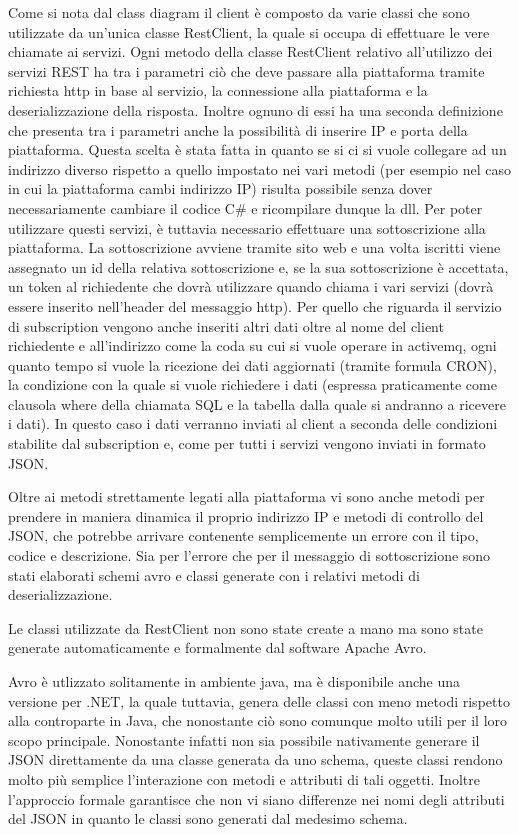Come si nota dal class diagram il client è composto da varie classi che sono utilizzate da un'unica classe RestClient, la quale si occupa di effettuare le vere chiamate ai servizi. Ogni metodo della classe RestClient relativo all’utilizzo dei servizi REST ha tra i parametri ciò che deve passare alla piattaforma tramite richiesta http in base al servizio, la connessione alla piattaforma e la deserializzazione della risposta. Inoltre ognuno di essi ha una seconda definizione che presenta tra i parametri anche la possibilità di inserire IP e porta della piattaforma. Questa scelta è stata fatta in quanto se si ci si vuole collegare ad un indirizzo diverso rispetto a quello impostato nei vari metodi (per esempio nel caso in cui la piattaforma cambi indirizzo IP) risulta possibile senza dover necessariamente cambiare il codice C\# e ricompilare dunque la dll. Per poter utilizzare questi servizi, è tuttavia necessario effettuare una sottoscrizione alla piattaforma. La sottoscrizione avviene tramite sito web e una volta iscritti viene assegnato un id della relativa sottoscrizione e, se la sua sottoscrizione è accettata, un token al richiedente che dovrà utilizzare quando chiama i vari servizi (dovrà essere inserito nell’header del messaggio http). Per quello che riguarda il servizio di subscription vengono anche inseriti altri dati oltre al nome del client richiedente e all’indirizzo come la coda su cui si vuole operare in activemq, ogni quanto tempo si vuole la ricezione dei dati aggiornati (tramite formula CRON), la condizione con la quale si vuole richiedere i dati (espressa praticamente come clausola where della chiamata SQL e la tabella dalla quale si andranno a ricevere i dati). In questo caso i dati verranno inviati al client a seconda delle condizioni stabilite dal subscription e, come per tutti i servizi vengono inviati in formato JSON.


Oltre ai metodi strettamente legati alla piattaforma vi sono anche metodi per prendere in maniera dinamica il proprio indirizzo IP e metodi di controllo del JSON, che potrebbe arrivare contenente semplicemente un errore con il tipo, codice e descrizione. Sia per l’errore che per il messaggio di sottoscrizione sono stati elaborati schemi avro e classi generate con i relativi metodi di deserializzazione. 

Le classi utilizzate da RestClient non sono state create a mano ma sono state generate automaticamente e formalmente dal software Apache Avro. 

Avro è utlizzato solitamente in ambiente java, ma è disponibile anche una versione per .NET, la quale tuttavia, genera delle classi con meno metodi rispetto alla controparte in Java, che nonostante ciò sono comunque molto utili per il loro scopo principale. Nonostante infatti non sia possibile nativamente generare il JSON direttamente da una classe generata da uno schema, queste classi rendono molto più semplice l’interazione con metodi e attributi di tali oggetti. Inoltre l’approccio formale garantisce che non vi siano differenze nei nomi degli attributi del JSON in quanto le classi sono generati dal medesimo schema.

